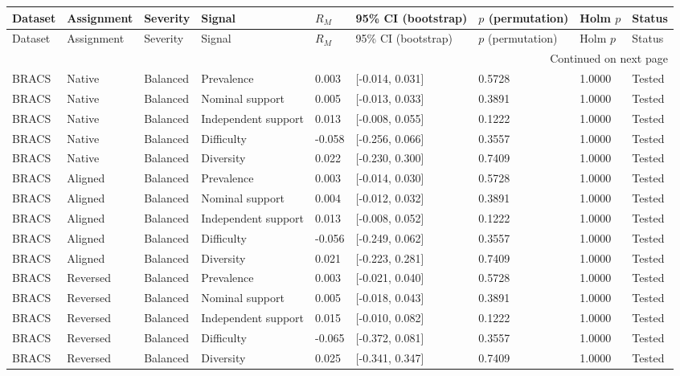 \begin{longtable}{lllllllll}
\toprule
Dataset & Assignment & Severity & Signal & $R_M$ & 95\% CI (bootstrap) & $p$ (permutation) & Holm $p$ & Status \\
\midrule
\endfirsthead
\toprule
Dataset & Assignment & Severity & Signal & $R_M$ & 95\% CI (bootstrap) & $p$ (permutation) & Holm $p$ & Status \\
\midrule
\endhead
\midrule
\multicolumn{9}{r}{Continued on next page} \\
\midrule
\endfoot
\bottomrule
\endlastfoot
BRACS & Native & Balanced & Prevalence & 0.003 & [-0.014, 0.031] & 0.5728 & 1.0000 & Tested \\
BRACS & Native & Balanced & Nominal support & 0.005 & [-0.013, 0.033] & 0.3891 & 1.0000 & Tested \\
BRACS & Native & Balanced & Independent support & 0.013 & [-0.008, 0.055] & 0.1222 & 1.0000 & Tested \\
BRACS & Native & Balanced & Difficulty & -0.058 & [-0.256, 0.066] & 0.3557 & 1.0000 & Tested \\
BRACS & Native & Balanced & Diversity & 0.022 & [-0.230, 0.300] & 0.7409 & 1.0000 & Tested \\
BRACS & Aligned & Balanced & Prevalence & 0.003 & [-0.014, 0.030] & 0.5728 & 1.0000 & Tested \\
BRACS & Aligned & Balanced & Nominal support & 0.004 & [-0.012, 0.032] & 0.3891 & 1.0000 & Tested \\
BRACS & Aligned & Balanced & Independent support & 0.013 & [-0.008, 0.052] & 0.1222 & 1.0000 & Tested \\
BRACS & Aligned & Balanced & Difficulty & -0.056 & [-0.249, 0.062] & 0.3557 & 1.0000 & Tested \\
BRACS & Aligned & Balanced & Diversity & 0.021 & [-0.223, 0.281] & 0.7409 & 1.0000 & Tested \\
BRACS & Reversed & Balanced & Prevalence & 0.003 & [-0.021, 0.040] & 0.5728 & 1.0000 & Tested \\
BRACS & Reversed & Balanced & Nominal support & 0.005 & [-0.018, 0.043] & 0.3891 & 1.0000 & Tested \\
BRACS & Reversed & Balanced & Independent support & 0.015 & [-0.010, 0.082] & 0.1222 & 1.0000 & Tested \\
BRACS & Reversed & Balanced & Difficulty & -0.065 & [-0.372, 0.081] & 0.3557 & 1.0000 & Tested \\
BRACS & Reversed & Balanced & Diversity & 0.025 & [-0.341, 0.347] & 0.7409 & 1.0000 & Tested \\

\end{longtable}

